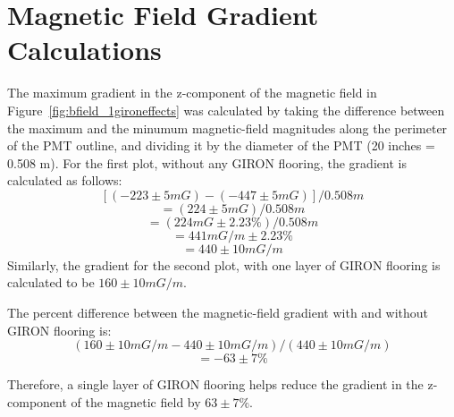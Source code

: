 
\appendix

\section{Magnetic Field Gradient Calculations}
\label{Appendix:MagneticFieldGradientCalculations}

The maximum gradient in the z-component of the magnetic field in Figure~\ref{fig:bfield_1gironeffects} was calculated by taking the difference between the maximum and the minumum magnetic-field magnitudes along the perimeter of the PMT outline, and dividing it by the diameter of the PMT (20 inches = 0.508 m).
For the first plot, without any GIRON flooring, the gradient is calculated as follows:
\[[(-223\pm5 mG) - (-447\pm5 mG)]/0.508 m\]
\[=(224\pm5 mG)/0.508 m\]
\[=(224 mG \pm 2.23\%)/0.508 m\]
\[=441 mG/m \pm 2.23\%\]
\[=440 \pm 10 mG/m \]
Similarly, the gradient for the second plot, with one layer of GIRON flooring is calculated to be $ 160 \pm 10 mG/m $.

The percent difference between the magnetic-field gradient with and without GIRON flooring is:
\[(160\pm10 mG/m - 440\pm10 mG/m)/(440\pm10 mG/m)\]
\[=-63\pm7\%\]

Therefore, a single layer of GIRON flooring helps reduce the gradient in the z-component of the magnetic field by $ 63\pm7\% $.
